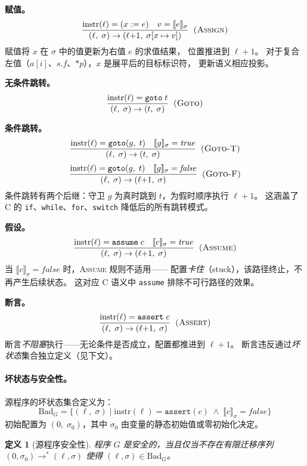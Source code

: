 \documentclass[11pt,a4paper]{article}
\newtheorem{definition}{定义}[section]
\begin{document}
\medskip
\noindent\textbf{赋值。}
\[ \dfrac{
  \mathrm{instr}(\ell) = (x := e) \quad
  v = \llbracket e \rrbracket_\sigma
}{
  (\ell,\; \sigma) \to (\ell{+}1,\; \sigma[x \mapsto v])
} \;\;\textsc{(Assign)}
\]
赋值将 $x$ 在 $\sigma$ 中的值更新为右值 $e$ 的求值结果，
位置推进到 $\ell+1$。
对于复合左值（$a[i]$、$s.f$、$*p$），$x$ 是展平后的目标标识符，
更新语义相应投影。

\medskip
\noindent\textbf{无条件跳转。}
\[ \dfrac{
  \mathrm{instr}(\ell) = \texttt{goto}\;t
}{
  (\ell,\; \sigma) \to (t,\; \sigma)
} \;\;\textsc{(Goto)}
\]

\medskip
\noindent\textbf{条件跳转。}
\[
\dfrac{
  \mathrm{instr}(\ell) = \texttt{goto}(g,\; t) \quad
  \llbracket g \rrbracket_\sigma = \mathit{true}
}{
  (\ell,\; \sigma) \to (t,\; \sigma)
} \;\;\textsc{(Goto-T)}
\]
\[
\dfrac{
  \mathrm{instr}(\ell) = \texttt{goto}(g,\; t) \quad
  \llbracket g \rrbracket_\sigma = \mathit{false}
}{
  (\ell,\; \sigma) \to (\ell{+}1,\; \sigma)
} \;\;\textsc{(Goto-F)}
\]
条件跳转有两个后继：守卫 $g$ 为真时跳到 $t$，为假时顺序执行 $\ell+1$。
这涵盖了 C 的 \texttt{if}、\texttt{while}、\texttt{for}、\texttt{switch}
降低后的所有跳转模式。

\medskip
\noindent\textbf{假设。}
\[
\dfrac{
  \mathrm{instr}(\ell) = \texttt{assume}\;c \quad
  \llbracket c \rrbracket_\sigma = \mathit{true}
}{
  (\ell,\; \sigma) \to (\ell{+}1,\; \sigma)
} \;\;\textsc{(Assume)}
\]
当 $\llbracket c \rrbracket_\sigma = \mathit{false}$ 时，\textsc{Assume} 规则不适用——
配置\emph{卡住}（stuck），该路径终止，不再产生后续状态。
这对应 C 语义中 \texttt{assume} 排除不可行路径的效果。

\medskip
\noindent\textbf{断言。}
\[
\dfrac{
  \mathrm{instr}(\ell) = \texttt{assert}\;c
}{
  (\ell,\; \sigma) \to (\ell{+}1,\; \sigma)
} \;\;\textsc{(Assert)}
\]
断言\emph{不阻塞}执行——无论条件是否成立，配置都推进到 $\ell+1$。
断言违反通过\emph{坏状态}集合独立定义（见下文）。

\paragraph{坏状态与安全性。}
源程序的坏状态集合定义为：
\[
\mathrm{Bad}_G = \{(\ell,\; \sigma) \mid
  \mathrm{instr}(\ell) = \texttt{assert}(c) \;\wedge\;
  \llbracket c \rrbracket_\sigma = \mathit{false} \}
\]
初始配置为 $(0,\; \sigma_0)$，其中 $\sigma_0$ 由变量的静态初始值或零初始化决定。

\begin{definition}[源程序安全性]
\label{def:source-safety}
程序 $G$ 是\emph{安全的}，当且仅当不存在有限迁移序列
$(0, \sigma_0) \to^* (\ell, \sigma)$ 使得 $(\ell, \sigma) \in \mathrm{Bad}_G$。
\end{definition}
\end{document}
